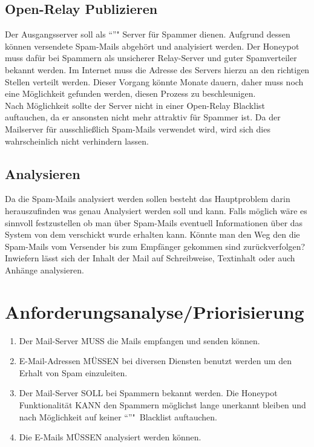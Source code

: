 \documentclass[a4paper,11pt,singlespacing]{article}
\begin{document}
	\subsection{Open-Relay Publizieren}\label{sec:ProblemstellungPublizieren}
		Der Ausgangsserver soll als "`"'" Server für Spammer dienen.
		Aufgrund dessen können versendete Spam-Mails abgehört und analyisiert werden.
		Der Honeypot muss dafür bei Spammern als unsicherer Relay-Server und guter Spamverteiler bekannt werden. %
		Im Internet muss die Adresse des Servers hierzu an den richtigen Stellen verteilt werden.
		Dieser Vorgang könnte Monate dauern, daher muss noch eine Möglichkeit gefunden werden, diesen Prozess zu beschleunigen.
		\\
		Nach Möglichkeit sollte der Server nicht in einer Open-Relay Blacklist auftauchen, da er ansonsten nicht mehr attraktiv für Spammer ist. %
		Da der Mailserver für ausschließlich Spam-Mails verwendet wird, wird sich dies wahrscheinlich nicht verhindern lassen.

	\subsection{Analysieren}\label{sec:ProblemstellungAnalysieren}
		Da die Spam-Mails analysiert werden sollen besteht das Hauptproblem darin herauszufinden was genau Analysiert werden soll und kann.
		Falls möglich wäre es sinnvoll festzustellen ob man über Spam-Mails eventuell Informationen über das System von dem verschickt wurde erhalten kann.
		Könnte man den Weg den die Spam-Mails vom Versender bis zum Empfänger gekommen sind zurückverfolgen?
		Inwiefern lässt sich der Inhalt der Mail auf Schreibweise, Textinhalt oder auch Anhänge analysieren.


\section{Anforderungsanalyse/Priorisierung}\label{sec:AnforderungsanalysePriorisierung}
	\begin{enumerate}
	\item Der Mail-Server MUSS die Mails empfangen und senden können. %
	\item E-Mail-Adressen MÜSSEN bei diversen Diensten benutzt werden um den Erhalt von Spam einzuleiten. %
	\item Der Mail-Server SOLL bei Spammern bekannt werden. Die Honeypot Funktionalität KANN den Spammern möglichst lange unerkannt bleiben und nach Möglichkeit auf keiner "`"'"~Blacklist auftauchen. %
	\item Die E-Mails MÜSSEN analysiert werden können.
	\end{enumerate}
\end{document}
